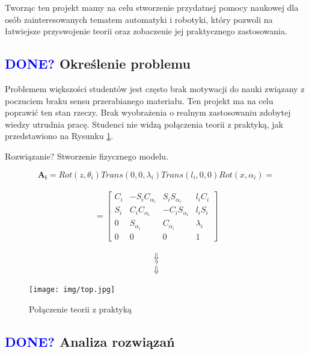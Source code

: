 \documentclass[11pt,titlepage,a4paper]{article}
\begin{document}
Tworząc ten projekt mamy na celu stworzenie przydatnej pomocy naukowej dla osób zainteresowanych tematem automatyki i robotyki, który pozwoli na łatwiejsze przyswojenie teorii oraz zobaczenie jej praktycznego zastosowania.

\subsection{\textcolor{blue}{DONE?} Określenie problemu}

Problemem większości studentów jest często brak motywacji do nauki związany z poczuciem braku sensu przerabianego materiału. Ten projekt ma na celu poprawić ten stan rzeczy.
Brak wyobrażenia o realnym zastosowaniu zdobytej wiedzy utrudnia pracę. Studenci nie widzą połączenia teorii z praktyką, jak przedstawiono na Rysunku \ref{teoriaVSprakrtyka}.

Rozwiązanie? Stworzenie fizycznego modelu.

\begin{figure}[h!]
    $$\boldsymbol{A_i}=Rot(z,\theta_i)Trans(0,0,\lambda_i)Trans(l_i,0,0)Rot(x,\alpha_i)=$$
    \\
    $$=\begin{bmatrix}
            C_i & -S_i C_{\alpha_i} & S_i S_{\alpha_i}  & l_i C_i   \\
            S_i & C_i C_{\alpha_i}  & -C_i S_{\alpha_i} & l_i S_i   \\
            0   & S_{\alpha_i}      & C_{\alpha_i}      & \lambda_i \\
            0   & 0                 & 0                 & 1
        \end{bmatrix}$$\cite{skryptPR}
    \\
    $$\Downarrow$$
    $$\mathord{?}$$
    $$\Downarrow$$
    \begin{center}
        \texttt{[image: img/top.jpg]}
    \end{center}
    \caption{Połączenie teorii z praktyką}
    \label{teoriaVSprakrtyka}
\end{figure}

\subsection{\textcolor{blue}{DONE?} Analiza rozwiązań}
\end{document}
